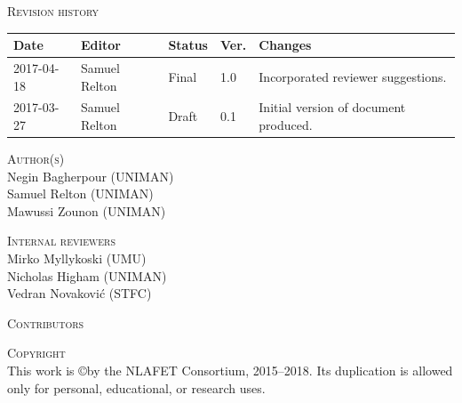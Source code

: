 \documentclass[a4paper,12pt]{article}
\begin{document}
\vspace{2em}




\noindent
\textsc{Revision history}\\[1em]
\begin{tabularx}{\linewidth}{@{}|l|l|l|l|X|}
  \hline
  \rowcolor{orange}
  \bf Date & \bf Editor & \bf Status & \bf Ver. & \bf Changes \\
  \hline
  2017-04-18 & Samuel Relton & Final & 1.0 & Incorporated reviewer suggestions.\\
  2017-03-27 & Samuel Relton & Draft & 0.1 & Initial version of
                                             document produced. \\
  \hline
\end{tabularx}

\vspace{2em}




\noindent
\textsc{Author(s)}\\[1em]
Negin Bagherpour (UNIMAN)\\
Samuel Relton (UNIMAN)\\
Mawussi Zounon (UNIMAN)

\vspace{2em}

\noindent
\textsc{Internal reviewers}\\[1em]
Mirko Myllykoski (UMU)\\
Nicholas Higham (UNIMAN)\\
Vedran Novakovi\'{c} (STFC)

\vspace{2em}


\noindent
\textsc{Contributors}\\[1em]

\vspace{2em}





\noindent
\textsc{Copyright}\\[1em]
This work is \copyright by the NLAFET Consortium, 2015--2018.
Its duplication is allowed only for personal, educational, or research uses.

\vspace{2em}
\end{document}
